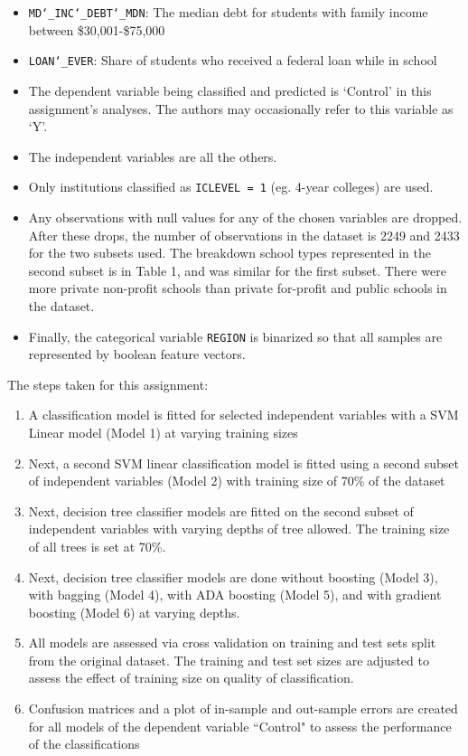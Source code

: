 \documentclass[10pt,twocolumn]{article}
\begin{document}
\begin{itemize}
\item \texttt{MD\char`_INC\char`_DEBT\char`_MDN}: The median debt for students with family income between \$30,001-\$75,000
\item \texttt{LOAN\char`_EVER}: Share of students who received a federal loan while in school
\item The dependent variable being classified and predicted is `Control' in this assignment's
analyses. The authors may occasionally refer to this variable as `Y'.
\item The independent variables are all the others.
\item Only institutions classified as \texttt{ICLEVEL = 1} (eg. 4-year colleges) are used.
\item Any observations with null values for any of the chosen variables
are dropped. After these drops, the number of observations
in the dataset is 2249 and 2433 for the two subsets used. The breakdown school types
represented in the second subset is in Table 1, and was similar for the first subset.
There were more private non-profit schools than private for-profit and public schools
in the dataset.
\item Finally, the categorical variable \texttt{REGION} is binarized so that all samples
are represented by boolean feature vectors.
\end{itemize}

The steps taken for this assignment:

\begin{enumerate}
\item A classification model is fitted for selected independent variables with
a SVM Linear model (Model 1) at varying training sizes
\item Next, a second SVM linear classification model is fitted using a second subset
of independent variables (Model 2) with training size of 70\% of the dataset
\item Next, decision tree classifier models are fitted on the second subset of independent variables
      with varying depths of tree allowed. The training size of all trees is set at 70\%.
\item Next, decision tree classifier models are done without boosting (Model 3), with bagging (Model 4),
with ADA boosting (Model 5), and with gradient boosting (Model 6) at varying depths.
\item All models are assessed via cross validation on training and test sets split
from the original dataset. The training and test set sizes are adjusted to assess the effect of training size on quality
of classification.
\item Confusion matrices and a plot of in-sample and out-sample errors
are created for all models of the dependent variable
``Control" to assess the performance of the classifications
\end{enumerate}
\end{document}
